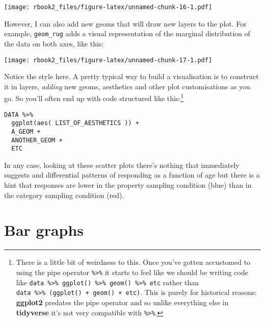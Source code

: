\documentclass[]{book}
\newenvironment{Shaded}{\begin{snugshade}}{\end{snugshade}}
\newcommand{\DataTypeTok}[1]{\textcolor[rgb]{0.13,0.29,0.53}{#1}}
\newcommand{\KeywordTok}[1]{\textcolor[rgb]{0.13,0.29,0.53}{\textbf{#1}}}
\newcommand{\NormalTok}[1]{#1}
\newcommand{\OperatorTok}[1]{\textcolor[rgb]{0.81,0.36,0.00}{\textbf{#1}}}
\newcommand{\StringTok}[1]{\textcolor[rgb]{0.31,0.60,0.02}{#1}}
\let\rmarkdownfootnote\footnote%
\def\footnote{\protect\rmarkdownfootnote}
\begin{document}
\texttt{[image: rbook2\_files/figure-latex/unnamed-chunk-16-1.pdf]}

However, I can also add new geoms that will draw new layers to the plot. For example, \texttt{geom\_rug} adds a visual representation of the marginal distribution of the data on both axes, like this:

\begin{Shaded}
\end{Shaded}

\texttt{[image: rbook2\_files/figure-latex/unnamed-chunk-17-1.pdf]}

Notice the style here. A pretty typical way to build a visualisation is to construct it in layers, \emph{adding} new geoms, aesthetics and other plot customisations as you go. So you'll often end up with code structured like this:\footnote{There is a little bit of weirdness to this. Once you've gotten accustomed to using the pipe operator \texttt{\%\textgreater{}\%} it starts to feel like we should be writing code like \texttt{data\ \%\textgreater{}\%\ ggplot()\ \%\textgreater{}\%\ geom()\ \%\textgreater{}\%\ etc} rather than \texttt{data\ \%\textgreater{}\%\ (ggplot()\ +\ geom()\ +\ etc)}. This is purely for historical reasons: \textbf{ggplot2} predates the pipe operator and so unlike everything else in \textbf{tidyverse} it's not very compatible with \texttt{\%\textgreater{}\%}.}

\begin{verbatim}
DATA %>%
  ggplot(aes( LIST_OF_AESTHETICS )) +
  A_GEOM +
  ANOTHER_GEOM +
  ETC
\end{verbatim}

In any case, looking at these scatter plots there's nothing that immediately suggests and differential patterns of responding as a function of age but there is a hint that responses are lower in the property sampling condition (blue) than in the category sampling condition (red).

\hypertarget{bar-graphs}{%
\section{Bar graphs}\label{bar-graphs}}
\end{document}
